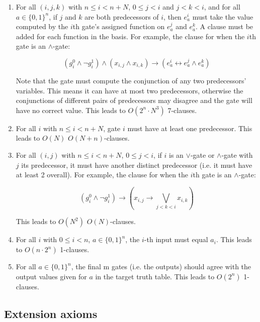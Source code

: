 \documentclass{article}
\begin{document}
\begin{enumerate}
  \item For all \((i,j,k)\) with \(n \leq i < n+N\), \(0 \leq j < i\) and \(j < k < i\), and for all \(a\in\{0,1\}^n\), if \(j\) and \(k\) are both predecessors of \(i\), then \(e^i_a\) must take the value computed by the \(i\)th gate's assigned function on \(e^j_a\) and \(e^k_a\). A clause must be added for each function in the basis. For example, the clause for when the \(i\)th gate is an \(\land\)-gate:

\[
(g^0_i\wedge \neg g^1_i)\wedge 
(x_{i,j}\wedge x_{i,k})\rightarrow 
(e^i_a\leftrightarrow e^j_a\wedge e^k_a)
\]
  
  Note that the gate must compute the conjunction of any two predecessors' variables. This means it can have at most two predecessors, otherwise the conjunctions of different pairs of predecessors may disagree and the gate will have no correct value. This leads to \(O(2^n\cdot N^3)\) 7-clauses.

  \item For all \(i\) with \(n \leq i < n+N\), gate \(i\) must have at least one predecessor. This leads to \(O(N)\) \(O(N+n)\)-clauses.

  \item For all \((i,j)\) with \(n \leq i < n+N\), \(0 \leq j < i\), if \(i\) is an \(\lor\)-gate or \(\land\)-gate with \(j\) its predecessor, it must have another distinct predecessor (i.e. it must have at least 2 overall). For example, the clause for when the \(i\)th gate is an \(\land\)-gate:

\[
(g^0_i \land \neg g^1_i) \rightarrow \left( x_{i,j} \rightarrow \bigvee_{j<k<i} x_{i,k} \right)
\]

  This leads to \(O(N^2)\) \(O(N)\)-clauses.

  \item For all \(i\) with \(0 \leq i < n\), \(a\in\{0,1\}^n\), the \(i\)-th input must equal \(a_i\). This leads to \(O(n \cdot 2^n)\) 1-clauses.

  \item For all \(a\in\{0,1\}^n\), the final m gates (i.e. the outputs) should agree with the output values given for \(a\) in the target truth table. This leads to \(O(2^n)\) 1-clauses.

\end{enumerate}

\subsection{Extension axioms}
\end{document}
